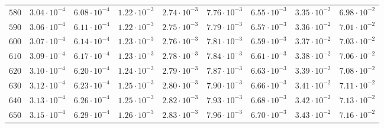 \begin{landscape}
\begin{table}
\begin{tabular}{lcccccccc}
$	580	$ & $	3.04 \cdot 10^{-4}	$ & $	6.08 \cdot 10^{-4}	$ & $	1.22 \cdot 10^{-3}	$ & $	2.74 \cdot 10^{-3}	$ & $	7.76 \cdot 10^{-3}	$ & $	6.55 \cdot 10^{-3}	$ & $	3.35 \cdot 10^{-2}	$ & $	6.98 \cdot 10^{-2}	 $ \\
$	590	$ & $	3.06 \cdot 10^{-4}	$ & $	6.11 \cdot 10^{-4}	$ & $	1.22 \cdot 10^{-3}	$ & $	2.75 \cdot 10^{-3}	$ & $	7.79 \cdot 10^{-3}	$ & $	6.57 \cdot 10^{-3}	$ & $	3.36 \cdot 10^{-2}	$ & $	7.01 \cdot 10^{-2}	 $ \\
$	600	$ & $	3.07 \cdot 10^{-4}	$ & $	6.14 \cdot 10^{-4}	$ & $	1.23 \cdot 10^{-3}	$ & $	2.76 \cdot 10^{-3}	$ & $	7.81 \cdot 10^{-3}	$ & $	6.59 \cdot 10^{-3}	$ & $	3.37 \cdot 10^{-2}	$ & $	7.03 \cdot 10^{-2}	 $ \\
$	610	$ & $	3.09 \cdot 10^{-4}	$ & $	6.17 \cdot 10^{-4}	$ & $	1.23 \cdot 10^{-3}	$ & $	2.78 \cdot 10^{-3}	$ & $	7.84 \cdot 10^{-3}	$ & $	6.61 \cdot 10^{-3}	$ & $	3.38 \cdot 10^{-2}	$ & $	7.06 \cdot 10^{-2}	 $ \\
$	620	$ & $	3.10 \cdot 10^{-4}	$ & $	6.20 \cdot 10^{-4}	$ & $	1.24 \cdot 10^{-3}	$ & $	2.79 \cdot 10^{-3}	$ & $	7.87 \cdot 10^{-3}	$ & $	6.63 \cdot 10^{-3}	$ & $	3.39 \cdot 10^{-2}	$ & $	7.08 \cdot 10^{-2}	 $ \\
$	630	$ & $	3.12 \cdot 10^{-4}	$ & $	6.23 \cdot 10^{-4}	$ & $	1.25 \cdot 10^{-3}	$ & $	2.80 \cdot 10^{-3}	$ & $	7.90 \cdot 10^{-3}	$ & $	6.66 \cdot 10^{-3}	$ & $	3.41 \cdot 10^{-2}	$ & $	7.11 \cdot 10^{-2}	 $ \\
$	640	$ & $	3.13 \cdot 10^{-4}	$ & $	6.26 \cdot 10^{-4}	$ & $	1.25 \cdot 10^{-3}	$ & $	2.82 \cdot 10^{-3}	$ & $	7.93 \cdot 10^{-3}	$ & $	6.68 \cdot 10^{-3}	$ & $	3.42 \cdot 10^{-2}	$ & $	7.13 \cdot 10^{-2}	 $ \\
$	650	$ & $	3.15 \cdot 10^{-4}	$ & $	6.29 \cdot 10^{-4}	$ & $	1.26 \cdot 10^{-3}	$ & $	2.83 \cdot 10^{-3}	$ & $	7.96 \cdot 10^{-3}	$ & $	6.70 \cdot 10^{-3}	$ & $	3.43 \cdot 10^{-2}	$ & $	7.16 \cdot 10^{-2}	 $ \\
\hline
  \end{tabular}
  \end{table}
\end{landscape}


